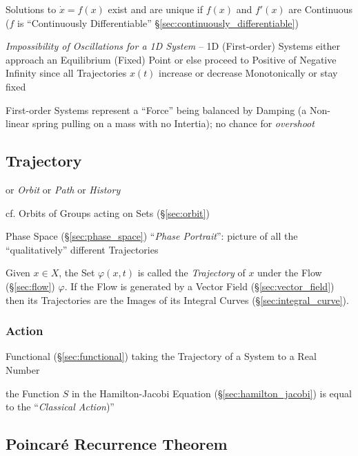 Solutions to $\dot{x} = f(x)$ exist and are unique if $f(x)$ and $f'(x)$ are
Continuous ($f$ is ``Continuously Differentiable''
\S\ref{sec:continuously_differentiable})

\emph{Impossibility of Oscillations for a 1D System} -- 1D (First-order)
Systems either approach an Equilibrium (Fixed) Point or else proceed to
Positive of Negative Infinity since all Trajectories $x(t)$ increase or
decrease Monotonically or stay fixed

First-order Systems represent a ``Force'' being balanced by Damping (a
Non-linear spring pulling on a mass with no Intertia); no chance for
\emph{overshoot}



\subsection{Trajectory}\label{sec:trajectory}

or \emph{Orbit} or \emph{Path} or \emph{History}

\fist cf. Orbits of Groups acting on Sets (\S\ref{sec:orbit})

Phase Space (\S\ref{sec:phase_space}) ``\emph{Phase Portrait}'': picture of all
the ``qualitatively'' different Trajectories

Given $x \in X$, the Set $\varphi(x,t)$ is called the \emph{Trajectory} of $x$
under the Flow (\S\ref{sec:flow}) $\varphi$. If the Flow is generated by a
Vector Field (\S\ref{sec:vector_field}) then its Trajectories are the Images of
its Integral Curves (\S\ref{sec:integral_curve}).



\subsubsection{Action}\label{sec:trajectory_action}

Functional (\S\ref{sec:functional}) taking the Trajectory of a System to a Real
Number

the Function $S$ in the Hamilton-Jacobi Equation (\S\ref{sec:hamilton_jacobi})
is equal to the ``\emph{Classical Action})''



\subsection{Poincar\'e Recurrence Theorem}\label{sec:poincare_recurrence}


